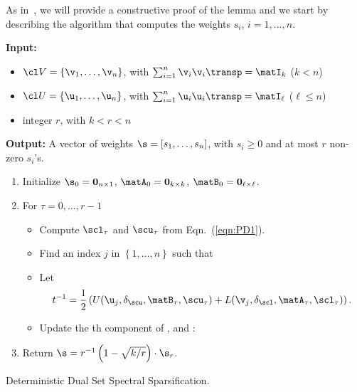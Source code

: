 As in~\cite{BSS09}, we will provide a constructive proof of the lemma and
we start by describing the algorithm that computes the weights
$s_i$, $i=1,\ldots,n$.
\begin{algorithm}[t]
\textbf{Input:}
     \begin{itemize}
          \item $ \cl V=\{\v_1,\ldots,\v_n\}$, with $\sum_{i=1}^{n}\v_i\v_i\transp=\matI_{k}$ ($k < n$)
          \item $ \cl U=\{\u_1,\ldots,\u_n\}$, with $\sum_{i=1}^{n}\u_i\u_i\transp=\matI_{\ell}$ ($\ell \leq n$)
          \item integer $r$, with $k < r < n$
     \end{itemize}

     \textbf{Output:} A vector of weights $\s=[s_1,\ldots,s_n]$, with $s_i \geq 0$ and at most $r$ non-zero $s_i$'s.

\begin{enumerate}

  \item Initialize $\s_0 = \textbf{0}_{n \times 1}$, $\matA_0 = \textbf{0}_{k \times k}$, $\matB_0 = \textbf{0}_{\ell \times \ell}$.

  \item For $\tau = 0,...,r-1$

        \begin{itemize}

           \item Compute $\scl_\tau$ and $\scu_\tau$ from Eqn.~(\ref{eqn:PD1}).

            \item Find an index $j$ in $\left\{1,\ldots,n\right\}$ such that
    \item Let
    \begin{equation}\label{eqn:weight}
    t^{-1} = \frac{1}{2}\left(U(\u_j,\delta_\scu,\matB_\tau,\scu_\tau) + L(\v_j,\delta_\scl, \matA_\tau,\scl_\tau)\right).
    \end{equation}

    \item Update the th
component of \math{\s}, \math{\matA_\tau} and \math{\matB_\tau}:

         \end{itemize}

  \item Return $\s = r^{-1}\left(1-\sqrt{k/r}\right)\cdot \s_r$.

\end{enumerate}
\caption{Deterministic Dual Set Spectral Sparsification.}
\label{alg:2set}
\end{algorithm}


